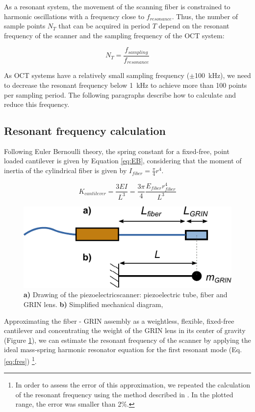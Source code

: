 As a resonant system, the movement of the scanning fiber is constrained to harmonic oscillations with a frequency close to $f_{resonance}$. Thus, the number of sample points $N_{T}$ that can be acquired in period $T$ depend on the resonant frequency of the scanner and the sampling frequency of the OCT system:

\begin{equation}
N_{T} = \frac{f_{sampling}}{f_{resonance}}
\label{eq:nT}
\end{equation}

As OCT systems have a relatively small sampling frequency ($\pm$\SI{100}{\kilo\hertz}), we need to decrease the resonant frequency below \SI{1}{kHz} to achieve more than 100 points per sampling period. The following paragraphs describe how to calculate and reduce this frequency.

\subsection{Resonant frequency calculation}
Following Euler Bernoulli theory, the spring constant for a fixed-free, point loaded cantilever is given by Equation \ref{eq:EB}, considering that the moment of inertia of the cylindrical fiber is given by $I_{fiber} = \frac{\pi}{4} r^4$.


\begin{equation}
K_{cantilever} = \frac{3 E I}{L^3} = \frac{3 \pi}{4} \frac{E_{fiber} r_{fiber}^4}{L^3}
\label{eq:EB}
\end{equation}

\begin{figure}[h!]\centering
      \includegraphics{figures/30_DesignSimulation/Mechanical/EB.pdf}
      \caption{\textbf{a)} Drawing of the piezoelectricscanner: piezoelectric tube, fiber and GRIN lens. 
      \textbf{b)} Simplified mechanical diagram, }
      \label{fig:EB}
\end{figure}

Approximating the fiber - GRIN assembly as a weightless, flexible, fixed-free cantilever and concentrating the weight of the GRIN lens in its center of gravity (Figure \ref{fig:EB}), we can estimate the resonant frequency of the scanner by applying the ideal mass-spring harmonic resonator equation for the first resonant mode (Eq. \ref{eq:fres}) \footnote{In order to assess the error of this approximation, we repeated the calculation of the resonant frequency using the method described in \cite{Huo2010}. In the plotted range, the error was smaller than 2\%.}. 

